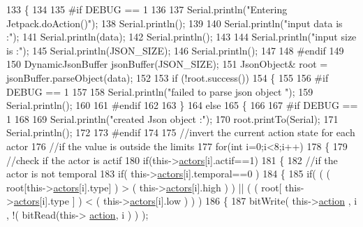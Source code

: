 \begin{DoxyCode}
133 \{
134 
135 \textcolor{preprocessor}{#if DEBUG == 1 }
136 
137     Serial.println(\textcolor{stringliteral}{"Entering Jetpack.doAction()"});
138     Serial.println();
139 
140     Serial.println(\textcolor{stringliteral}{"input data is :"});
141     Serial.println(data);
142     Serial.println();
143 
144     Serial.println(\textcolor{stringliteral}{"input size is :"});  
145     Serial.println(JSON\_SIZE);
146     Serial.println();
147 
148 \textcolor{preprocessor}{#endif }
149 
150     DynamicJsonBuffer jsonBuffer(JSON\_SIZE);
151     JsonObject& root = jsonBuffer.parseObject(data);
152     
153     \textcolor{keywordflow}{if} (!root.success()) 
154     \{
155     
156 \textcolor{preprocessor}{    #if DEBUG == 1 }
157 
158         Serial.println(\textcolor{stringliteral}{"failed to parse json object "});
159         Serial.println();
160     
161 \textcolor{preprocessor}{    #endif }
162 
163     \}
164     \textcolor{keywordflow}{else}
165     \{
166     
167 \textcolor{preprocessor}{    #if DEBUG == 1 }
168 
169         Serial.println(\textcolor{stringliteral}{"created Json object :"});
170         root.printTo(Serial);
171         Serial.println();
172     
173 \textcolor{preprocessor}{    #endif }
174 
175         \textcolor{comment}{//invert the current action state for each actor}
176         \textcolor{comment}{//if the value is outside the limits}
177         \textcolor{keywordflow}{for}(\textcolor{keywordtype}{int} i=0;i<8;i++)
178         \{
179             \textcolor{comment}{//check if the actor is actif }
180             \textcolor{keywordflow}{if}(this->\hyperlink{classJetpack_a7e16d2f97837f9712a2e6de1c50d99db}{actors}[i].actif==1)
181             \{   
182                 \textcolor{comment}{//if the actor is not temporal}
183                 \textcolor{keywordflow}{if}( this->\hyperlink{classJetpack_a7e16d2f97837f9712a2e6de1c50d99db}{actors}[i].temporal==0 ) 
184                 \{
185                     \textcolor{keywordflow}{if}( ( ( root[this->\hyperlink{classJetpack_a7e16d2f97837f9712a2e6de1c50d99db}{actors}[i].type] ) > ( this->\hyperlink{classJetpack_a7e16d2f97837f9712a2e6de1c50d99db}{actors}[i].high ) ) || ( ( 
      root[ this->\hyperlink{classJetpack_a7e16d2f97837f9712a2e6de1c50d99db}{actors}[i].type ] ) < ( this->\hyperlink{classJetpack_a7e16d2f97837f9712a2e6de1c50d99db}{actors}[i].low ) ) )   
186                     \{   
187                         bitWrite( this->\hyperlink{classJetpack_aca3142925a7b0834b34ae91d26af7765}{action} , i , !( bitRead(this->
      \hyperlink{classJetpack_aca3142925a7b0834b34ae91d26af7765}{action}, i ) ) );  

\end{DoxyCode}
